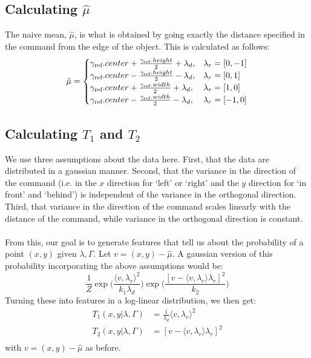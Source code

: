 \documentclass[12pt,letterpaper]{article}
\newcommand\refobj{\textmd{ref}}
\begin{document}
\subsection{Calculating $\hat{\mu}$}
The naive mean, $\hat{\mu}$, is what is obtained by going exactly the distance specified in the command from the edge of the object. This is calculated as follows:
\[
\hat{\mu} = \begin{cases} \gamma_\refobj.center + \frac{\gamma_\refobj.height}{2} + \lambda_d, & \lambda_r = [0, -1] \\
\gamma_\refobj.center - \frac{\gamma_\refobj.height}{2} - \lambda_d, & \lambda_r = [0, 1] \\
 \gamma_\refobj.center + \frac{\gamma_\refobj.width}{2} + \lambda_d, & \lambda_r = [1, 0] \\
 \gamma_\refobj.center - \frac{\gamma_\refobj.width}{2} - \lambda_d, & \lambda_r = [-1, 0] \end{cases}
\]

\subsection{Calculating $T_1$ and $T_2$}
We use three assumptions about the data here. First, that the data are distributed in a gaussian manner. Second, that the variance in the direction of the command (i.e. in the $x$ direction for `left' or `right' and the $y$ direction for `in front' and `behind') is independent of the variance in the orthogonal direction. Third, that variance in the direction of the command scales linearly with the distance of the command, while variance in the orthogonal direction is constant. \\
\\
From this, our goal is to generate features that tell us about the probability of a point $(x, y)$ given $\lambda, \Gamma$. Let $v = (x, y) - \hat{\mu}$. A gaussian version of this probability incorporating the above assumptions would be:
\[
\frac{1}{Z}\exp\bigg(\frac{\langle v, \lambda_r\rangle^2}{k_1 \lambda_d}\bigg)\exp\bigg(\frac{[v - \langle v, \lambda_r\rangle\lambda_r]^2}{k_2}\bigg)
\]
Turning these into features in a log-linear distribution, we then get:
\begin{equation*}
\begin{split}
T_1(x, y | \lambda, \Gamma) &= \frac{1}{\lambda_d} \langle v, \lambda_r \rangle^2 \\
T_2(x, y | \lambda, \Gamma) &= [v - \langle v, \lambda_r \rangle\lambda_r]^2 \\
\end{split}
\end{equation*}
with $v = (x, y) - \hat{\mu}$ as before.
\end{document}
